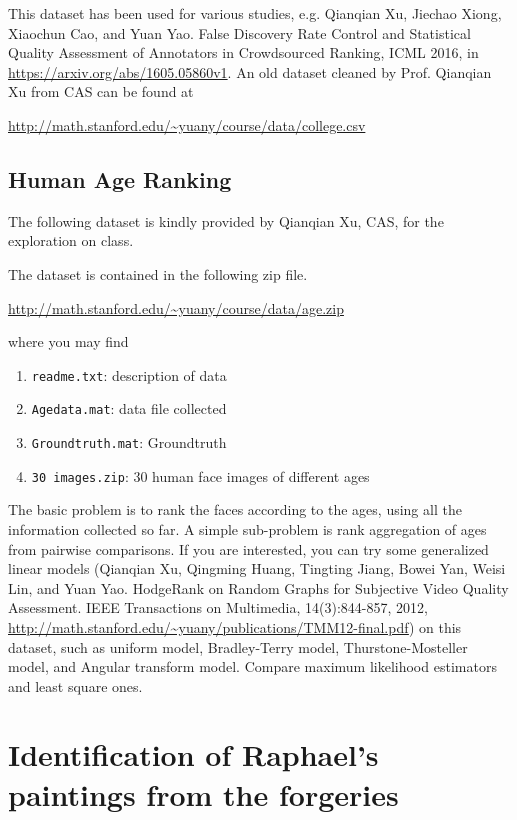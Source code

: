 \documentclass[11pt]{article}
\begin{document}
This dataset has been used for various studies, e.g. Qianqian Xu, Jiechao Xiong, Xiaochun Cao, and Yuan Yao. False Discovery Rate Control and Statistical Quality Assessment of Annotators in Crowdsourced Ranking, ICML 2016, in \url{https://arxiv.org/abs/1605.05860v1}. An old dataset cleaned by Prof. Qianqian Xu from CAS can be found at

\url{http://math.stanford.edu/~yuany/course/data/college.csv}

\subsection{Human Age Ranking}


The following dataset is kindly provided by Qianqian Xu, CAS, for the exploration on class. 

The dataset is contained in the following zip file.

\url{http://math.stanford.edu/~yuany/course/data/age.zip}

\noindent where you may find
\begin{enumerate}
\item \texttt{readme.txt}: description of data
\item \texttt{Agedata.mat}: data file collected
\item \texttt{Groundtruth.mat}: Groundtruth
\item \texttt{30 images.zip}: 30 human face images of different ages
\end{enumerate}

The basic problem is to rank the faces according to the ages, using all the information collected so far. A simple sub-problem is rank aggregation of ages from pairwise comparisons. If you are interested, you can try some generalized linear models (Qianqian Xu, Qingming Huang, Tingting Jiang, Bowei Yan, Weisi Lin, and Yuan Yao. HodgeRank on Random Graphs for Subjective Video Quality Assessment. IEEE Transactions on Multimedia, 14(3):844-857, 2012, \url{http://math.stanford.edu/~yuany/publications/TMM12-final.pdf}) on this dataset, such as uniform model, Bradley-Terry model, Thurstone-Mosteller model, and Angular transform model. Compare maximum likelihood estimators and least square ones. 

\section{Identification of Raphael's paintings from the forgeries}
\end{document}
